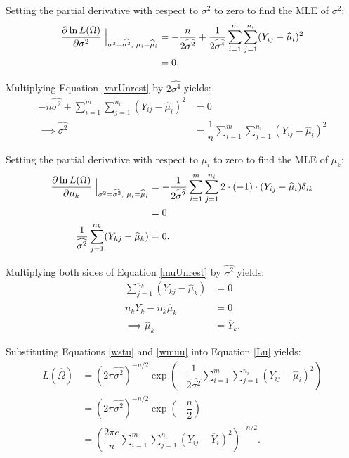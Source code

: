 \documentclass[12pt,a4paper,openright]{article}
\newcommand{\eqn}[1]{Equation \ref{#1}}
\newcommand{\ovY}{\overline{Y}}
\newcommand{\wmu}{\widehat{\mu}}
\newcommand{\wst}{\widehat{\sigma^2}}
\begin{document}
	Setting the partial derivative with respect to $\sigma^2$ to zero to find the MLE of $\sigma^2$:
	\begin{align}
		\dfrac{\partial \ln{L(\Omega)}}{\partial \sigma^2} \Bigm\lvert_{\sigma^2=\wst, \hspace{0.1cm}\mu_i = \wmu_i} &= -\dfrac{n}{2\wst} + \dfrac{1}{2\widehat{\sigma^4}} \sum_{i=1}^m \sum_{j=1}^{n_i} (Y_{ij}-\wmu_i)^2 \nonumber \\
		&=0. \label{varUnrest}
	\end{align}

	Multiplying \eqn{varUnrest} by $2\widehat{\sigma^4}$ yields:
	\begin{align}
		-n\wst + \sum_{i=1}^m \sum_{j=1}^{n_i} (Y_{ij}-\wmu_i)^2 &= 0 \nonumber \\
		\implies \wst &= \dfrac{1}{n}\sum_{i=1}^m \sum_{j=1}^{n_i} (Y_{ij}-\wmu_i)^2 \label{wstu}
	\end{align}
	
	Setting the partial derivative with respect to $\mu_i$ to zero to find the MLE of $\mu_k$:
	\begin{align}
		\dfrac{\partial \ln{L(\Omega)}}{\partial \mu_k} \Bigm\lvert_{\sigma^2=\wst,\hspace{0.1cm}\mu_i=\wmu_i} &= -\dfrac{1}{2\wst} \sum_{i=1}^m \sum_{j=1}^{n_i} 2\cdot (-1)\cdot (Y_{ij}-\wmu_i)\delta_{ik} \nonumber \\
		&= 0 \nonumber\\
		\dfrac{1}{\wst}\sum_{j=1}^{n_k} (Y_{kj}-\wmu_k) &= 0. \label{muUnrest}
	\end{align}

	Multiplying both sides of \eqn{muUnrest} by $\wst$ yields:
	\begin{align}
		\sum_{j=1}^{n_k} (Y_{kj}-\wmu_k) &= 0 \nonumber \\
		n_k\ovY_k - n_k\wmu_k &= 0 \nonumber \\ 
		\implies \wmu_k &= \ovY_k. \label{wmuu}
	\end{align}

	Substituting Equations \ref{wstu} and \ref{wmuu} into \eqn{Lu} yields:
	\begin{align}
		L(\widehat{\Omega}) &= (2\pi \wst)^{-n/2} \exp{\left(-\dfrac{1}{2\wst}\sum_{i=1}^m \sum_{j=1}^{n_i} (Y_{ij}-\wmu_i)^2\right)} \nonumber \\
		&= (2\pi \wst)^{-n/2} \exp{\left(-\dfrac{n}{2}\right)} \nonumber \\
		&= \left(\dfrac{2\pi e}{n} \sum_{i=1}^m \sum_{j=1}^{n_i} (Y_{ij}-\ovY_i)^2\right)^{-n/2}. \label{MLEu}
	\end{align}
\end{document}
